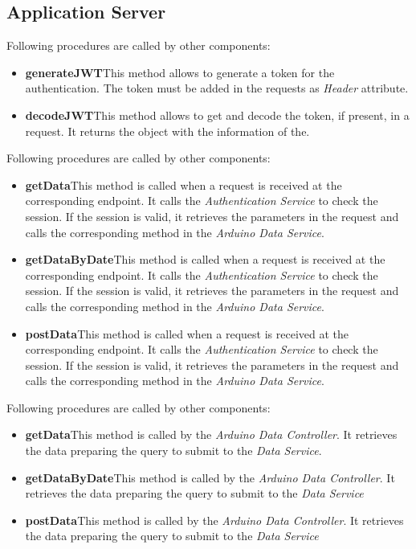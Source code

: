 \subsection{Application Server}

Following procedures are called by other components:
\begin{itemize}
    \item \textbf{generateJWT}\quad This method allows to generate a token for the authentication. The token must be added in the requests as \textit{Header} attribute.
    \item \textbf{decodeJWT}\quad This method allows to get and decode the token, if present, in a request. It returns the object with the information of the.
\end{itemize}

Following procedures are called by other components:
\begin{itemize}
    \item \textbf{getData}\quad This method is called when a request is received at the corresponding endpoint. It calls the \textit{Authentication Service} to check the session. If the session is valid, it retrieves the parameters in the request and calls the corresponding method in the \textit{Arduino Data Service}.
    \item \textbf{getDataByDate}\quad This method is called when a request is received at the corresponding endpoint. It calls the \textit{Authentication Service} to check the session. If the session is valid, it retrieves the parameters in the request and calls the corresponding method in the \textit{Arduino Data Service}.
    \item \textbf{postData}\quad This method is called when a request is received at the corresponding endpoint. It calls the \textit{Authentication Service} to check the session. If the session is valid, it retrieves the parameters in the request and calls the corresponding method in the \textit{Arduino Data Service}.
\end{itemize}

Following procedures are called by other components:
\begin{itemize}
    \item \textbf{getData}\quad This method is called by the \textit{Arduino Data Controller}. It retrieves the data preparing the query to submit to the \textit{Data Service}.
    \item \textbf{getDataByDate}\quad This method is called by the \textit{Arduino Data Controller}. It retrieves the data preparing the query to submit to the \textit{Data Service}
    \item \textbf{postData}\quad This method is called by the \textit{Arduino Data Controller}. It retrieves the data preparing the query to submit to the \textit{Data Service}
\end{itemize}

